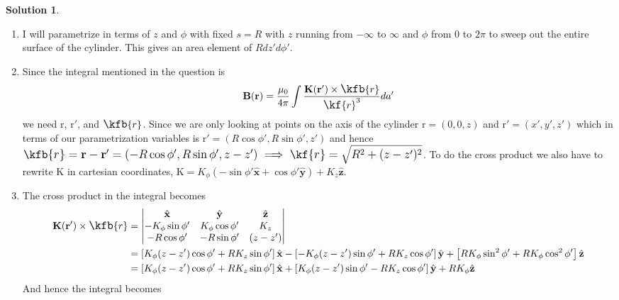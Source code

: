 \documentclass[10pt]{article}
\theoremstyle{definition}
\newtheorem{soln}{Solution}
\newcommand{\ux}{\hat{\mathbf{x}}}
\newcommand{\uy}{\hat{\mathbf{y}}}
\newcommand{\uz}{\hat{\mathbf{z}}}
\newcommand{\pr}[1]{{#1^\prime}}
\newcommand{\scriptr}{\fontsize{12pt}{12pt}\kf{r}}
\newcommand{\bscriptr}{\fontsize{12pt}{12pt}\kfb{r}}
\newcommand{\bv}[1]{\bm{\mathrm{#1}}}
\begin{document}
\begin{soln}
\begin{enumerate}[label=(\alph*)]
\begin{center}
          \end{center}
    \item I will parametrize in terms of $z$ and $\phi$ with fixed $s=R$ with $z$ running from $-\infty$ to $\infty$ and $\phi$ from $0$ to $2\pi$ to sweep out the entire
          surface of the cylinder. This gives an area element of $Rdz'd\phi'$.
    \item Since the integral mentioned in the question is
          $$\bv{B}(\bv{r})=\frac{\mu_0}{4\pi}\int\frac{\bv{K}(\bv{r}')\times \bscriptr}{\scriptr^3}d\pr{a}$$
          we need $\bv{r}$, $\bv{r}'$, and $\bscriptr$. Since we are only looking at points on the axis of the cylinder $\bv{r}=(0,0,z)$ and
          $\bv{r}'=(x',y',z')$ which in terms of our parametrization variables is $\bv{r}'=(R\cos\phi',R\sin\phi',z')$ and hence
          $\bscriptr=\bv{r}-\bv{r}'=(-R\cos\phi',R\sin\phi',z-z')\implies \scriptr=\sqrt{R^2+(z-z')^2}$. To do the cross product we also have to rewrite $\bv{K}$
          in cartesian coordinates, $\bv{K}=K_\phi(-\sin\phi'\ux+\cos\phi'\uy)+K_z\uz$.
    \item The cross product in the integral becomes
          \begin{align*}
            \bv{K}(\bv{r}')\times \bscriptr & =\begin{vmatrix}
                                                 \ux              & \uy             & \uz    \\
                                                 -K_\phi\sin\phi' & K_\phi\cos\phi' & K_z    \\
                                                 -R\cos\phi'      & -R\sin\phi'     & (z-z')
                                               \end{vmatrix}         \\
                                            & =\left[K_\phi(z-z')\cos\phi'+RK_z\sin\phi'\right]\ux
            -\left[-K_\phi(z-z')\sin\phi'+RK_z\cos\phi'\right]\uy
            +\left[RK_\phi\sin^2\phi'+RK_\phi\cos^2\phi'\right]\uz                                 \\
                                            & =\left[K_\phi(z-z')\cos\phi'+RK_z\sin\phi'\right]\ux
            +\left[K_\phi(z-z')\sin\phi'-RK_z\cos\phi'\right]\uy
            +RK_\phi\uz
          \end{align*}
          And hence the integral becomes

\end{enumerate}
\end{soln}
\end{document}
